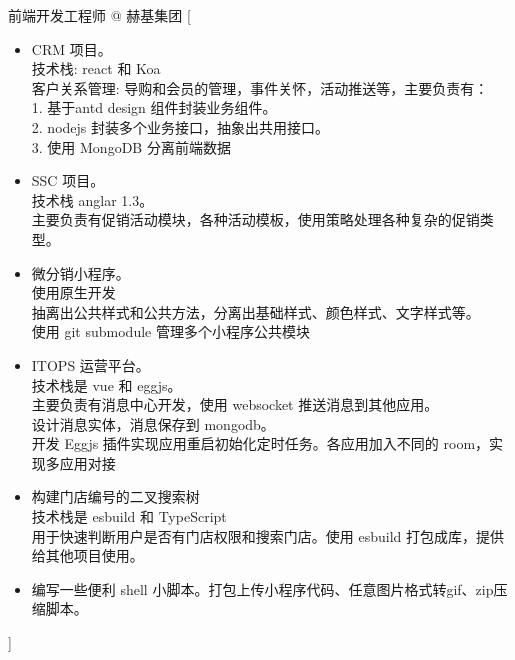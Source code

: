 \documentclass[zh]{resume}
\begin{document}
\begin{experiences}
    {前端开发工程师 @ 赫基集团}%
    [\begin{itemize}
      \item CRM 项目。\\ 技术栈: react 和 Koa \\ 客户关系管理: 导购和会员的管理，事件关怀，活动推送等，主要负责有：\\ 1. 基于antd design 组件封装业务组件。\\ 2. nodejs 封装多个业务接口，抽象出共用接口。 \\ 3. 使用 MongoDB 分离前端数据 \\ 
      \item SSC 项目。\\ 技术栈 anglar 1.3。\\ 主要负责有促销活动模块，各种活动模板，使用策略处理各种复杂的促销类型。 \\ 
      \item 微分销小程序。\\ 使用原生开发 \\ 抽离出公共样式和公共方法，分离出基础样式、颜色样式、文字样式等。\\ 使用 git submodule 管理多个小程序公共模块 \\ 
      \item ITOPS 运营平台。\\ 技术栈是 vue 和 eggjs。\\ 主要负责有消息中心开发，使用 websocket 推送消息到其他应用。\\ 设计消息实体，消息保存到 mongodb。\\ 开发 Eggjs 插件实现应用重启初始化定时任务。各应用加入不同的 room，实现多应用对接 \\ 
      \item 构建门店编号的二叉搜索树 \\ 技术栈是 esbuild 和 TypeScript \\ 用于快速判断用户是否有门店权限和搜索门店。使用 esbuild 打包成库，提供给其他项目使用。\\
      \item 编写一些便利 shell 小脚本。打包上传小程序代码、任意图片格式转gif、zip压缩脚本。 \\ 
    \end{itemize}]


\end{experiences}
\end{document}
